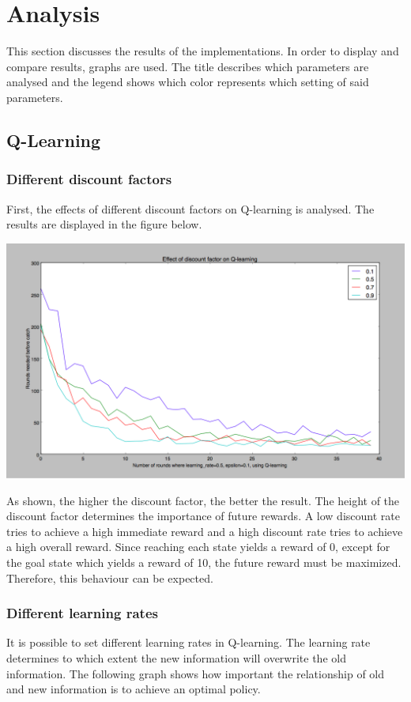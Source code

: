 \documentclass{article}
\begin{document}
\section{Analysis}
This section discusses the results of the implementations. In order to display and compare results, graphs are used. The title describes which parameters are analysed and the legend shows which color represents which setting of said parameters.

\subsection{Q-Learning}

\subsubsection{Different discount factors}
First, the effects of different discount factors on Q-learning is analysed. The results are displayed in the figure below.

\begin{center}
	\includegraphics[scale=0.4]{discount_factors}
\end{center}

As shown, the higher the discount factor, the better the result. The height of the discount factor determines the importance of future rewards. A low discount rate tries to achieve a high immediate reward and a high discount rate tries to achieve a high overall reward. Since reaching each state yields a reward of 0, except for the goal state which yields a reward of 10, the future reward must be maximized. Therefore, this behaviour can be expected. 

\subsubsection{Different learning rates}
It is possible to set different learning rates in Q-learning. The learning rate determines to which extent the new information will overwrite the old information. The following graph shows how important the relationship of old and new information is to achieve an optimal policy.
\end{document}
